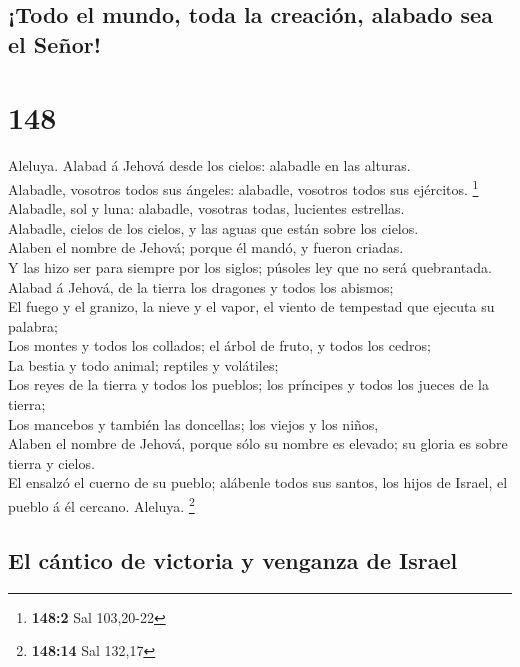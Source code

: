 \hypertarget{todo-el-mundo-toda-la-creaciuxf3n-alabado-sea-el-seuxf1or}{%
\subsection{¡Todo el mundo, toda la creación, alabado sea el
Señor!}\label{todo-el-mundo-toda-la-creaciuxf3n-alabado-sea-el-seuxf1or}}

\hypertarget{section-147}{%
\section{148}\label{section-147}}

 Aleluya. Alabad á Jehová desde los cielos: alabadle en las
alturas.\\
 Alabadle, vosotros todos sus ángeles: alabadle, vosotros
todos sus ejércitos. \footnote{\textbf{148:2} Sal 103,20-22}\\
 Alabadle, sol y luna: alabadle, vosotras todas, lucientes
estrellas.\\
 Alabadle, cielos de los cielos, y las aguas que están sobre
los cielos.\\
 Alaben el nombre de Jehová; porque él mandó, y fueron
criadas.\\
 Y las hizo ser para siempre por los siglos; púsoles ley que
no será quebrantada.\\
 Alabad á Jehová, de la tierra los dragones y todos los
abismos;\\
 El fuego y el granizo, la nieve y el vapor, el viento de
tempestad que ejecuta su palabra;\\
 Los montes y todos los collados; el árbol de fruto, y todos
los cedros;\\
 La bestia y todo animal; reptiles y volátiles;\\
 Los reyes de la tierra y todos los pueblos; los príncipes
y todos los jueces de la tierra;\\
 Los mancebos y también las doncellas; los viejos y los
niños,\\
 Alaben el nombre de Jehová, porque sólo su nombre es
elevado; su gloria es sobre tierra y cielos.\\
 El ensalzó el cuerno de su pueblo; alábenle todos sus
santos, los hijos de Israel, el pueblo á él cercano. Aleluya.
\footnote{\textbf{148:14} Sal 132,17}

\hypertarget{el-cuxe1ntico-de-victoria-y-venganza-de-israel}{%
\subsection{El cántico de victoria y venganza de
Israel}\label{el-cuxe1ntico-de-victoria-y-venganza-de-israel}}

